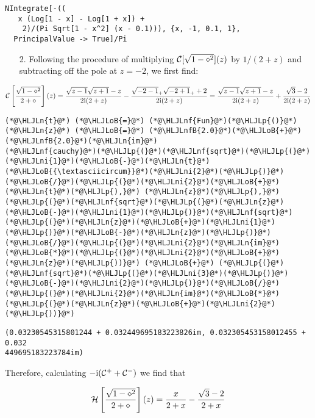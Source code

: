 \documentclass[12pt,a4paper]{article}
\newcommand{\HLJLn}[1]{#1}
\newcommand{\HLJLnf}[1]{\textcolor[RGB]{66,102,213}{#1}}
\newcommand{\HLJLnfB}[1]{\textcolor[RGB]{59,151,46}{#1}}
\newcommand{\HLJLni}[1]{\textcolor[RGB]{59,151,46}{#1}}
\newcommand{\HLJLoB}[1]{\textcolor[RGB]{102,102,102}{\textbf{#1}}}
\newcommand{\HLJLp}[1]{#1}
\def\I{ {\rm i} }
\def\CC{ {\cal C} }
\def\HH{ {\cal H} }
\begin{document}
\begin{verbatim}
NIntegrate[-((
   x (Log[1 - x] - Log[1 + x]) +
    2)/(Pi Sqrt[1 - x^2] (x - 0.1))), {x, -1, 0.1, 1},
  PrincipalValue -> True]/Pi
\end{verbatim}
\begin{itemize}
\item[2. ] Following the procedure of multiplying $\CC[\sqrt{1-\diamond^2}](z)$ by $1/(2+z)$ and subtracting off the pole at $z=-2$, we first find:

\end{itemize}
\[
\CC\left[{\sqrt{1-\diamond^2} \over 2+\diamond}\right](z) = {\sqrt{z-1}\sqrt{z+1} - z \over 2\I(2+z)} -{\sqrt{-2-1}_+ \sqrt{-2+1}_+ +2 \over 2\I(2+z)} = {\sqrt{z-1}\sqrt{z+1} - z \over 2\I(2+z)} +{ \sqrt{3} -2 \over 2\I(2+z)}
\]

\begin{lstlisting}
(*@\HLJLn{t}@*) (*@\HLJLoB{=}@*) (*@\HLJLnf{Fun}@*)(*@\HLJLp{()}@*)
(*@\HLJLn{z}@*) (*@\HLJLoB{=}@*) (*@\HLJLnfB{2.0}@*)(*@\HLJLoB{+}@*)(*@\HLJLnfB{2.0}@*)(*@\HLJLn{im}@*)
(*@\HLJLnf{cauchy}@*)(*@\HLJLp{(}@*)(*@\HLJLnf{sqrt}@*)(*@\HLJLp{(}@*)(*@\HLJLni{1}@*)(*@\HLJLoB{-}@*)(*@\HLJLn{t}@*)(*@\HLJLoB{{\textasciicircum}}@*)(*@\HLJLni{2}@*)(*@\HLJLp{)}@*)(*@\HLJLoB{/}@*)(*@\HLJLp{(}@*)(*@\HLJLni{2}@*)(*@\HLJLoB{+}@*)(*@\HLJLn{t}@*)(*@\HLJLp{),}@*) (*@\HLJLn{z}@*)(*@\HLJLp{),}@*) (*@\HLJLp{(}@*)(*@\HLJLnf{sqrt}@*)(*@\HLJLp{(}@*)(*@\HLJLn{z}@*)(*@\HLJLoB{-}@*)(*@\HLJLni{1}@*)(*@\HLJLp{)}@*)(*@\HLJLnf{sqrt}@*)(*@\HLJLp{(}@*)(*@\HLJLn{z}@*)(*@\HLJLoB{+}@*)(*@\HLJLni{1}@*)(*@\HLJLp{)}@*)(*@\HLJLoB{-}@*)(*@\HLJLn{z}@*)(*@\HLJLp{)}@*)(*@\HLJLoB{/}@*)(*@\HLJLp{(}@*)(*@\HLJLni{2}@*)(*@\HLJLn{im}@*)(*@\HLJLoB{*}@*)(*@\HLJLp{(}@*)(*@\HLJLni{2}@*)(*@\HLJLoB{+}@*)(*@\HLJLn{z}@*)(*@\HLJLp{))}@*) (*@\HLJLoB{+}@*) (*@\HLJLp{(}@*)(*@\HLJLnf{sqrt}@*)(*@\HLJLp{(}@*)(*@\HLJLni{3}@*)(*@\HLJLp{)}@*)(*@\HLJLoB{-}@*)(*@\HLJLni{2}@*)(*@\HLJLp{)}@*)(*@\HLJLoB{/}@*)(*@\HLJLp{(}@*)(*@\HLJLni{2}@*)(*@\HLJLn{im}@*)(*@\HLJLoB{*}@*)(*@\HLJLp{(}@*)(*@\HLJLn{z}@*)(*@\HLJLoB{+}@*)(*@\HLJLni{2}@*)(*@\HLJLp{))}@*)
\end{lstlisting}

\begin{lstlisting}
(0.03230545315801244 + 0.032449695183223826im, 0.032305453158012455 + 0.032
449695183223784im)
\end{lstlisting}


Therefore, calculating $-\I(\CC^+ + \CC^-)$ we find that

\[
\HH\left[{\sqrt{1-\diamond^2} \over 2+\diamond}\right](z) = {x\over 2+x} -{ \sqrt{3} -2 \over 2+x}
\]
\end{document}
